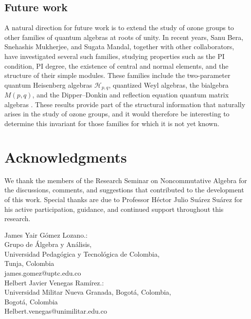 \documentclass[11pt]{article}
\theoremstyle{definition}
\begin{document}
\subsection*{Future work}
A natural direction for future work is to extend the study of ozone groups to other families of quantum algebras at roots of unity. In recent years,
Sanu Bera, Snehashis Mukherjee, and Sugata Mandal, together with other
collaborators, have investigated several such families, studying
properties such as the PI condition, PI degree, the existence of central
and normal elements, and the structure of their simple modules. These
families include the two-parameter quantum Heisenberg algebras
\(\mathcal H_{p,q}\), quantized Weyl algebras, the bialgebra \(M(p,q)\),
and the Dipper--Donkin and reflection equation quantum matrix algebras
\cite{BeraMandalNandy2024, BeraMukherjee2024DipperDonkin,Mukherjee2026Bialgebra,  MukherjeeBera2025}. These results provide part of the structural information that naturally
arises in the study of ozone groups, and it would therefore be interesting
to determine this invariant for those families for which it is not yet
known.

\section*{Acknowledgments}

We thank the members of the Research Seminar on Noncommutative Algebra for
the discussions, comments, and suggestions that contributed to the development
of this work. Special thanks are due to Professor Héctor Julio Suárez Suárez
for his active participation, guidance, and continued support throughout this
research.



\bigskip
\noindent
James Yair Gómez Lozano.:\\
Grupo de Álgebra y Análisis,\\
Universidad Pedagógica y Tecnológica de Colombia,\\
Tunja, Colombia\\
james.gomez@uptc.edu.co\\

Helbert Javier Venegas Ramírez.:\\
Universidad Militar Nueva Granada, Bogot\'a, Colombia,\\
Bogotá, Colombia\\
Helbert.venegas@unimilitar.edu.co
\end{document}
